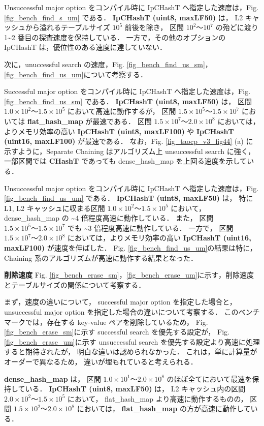 Unsuccessful major option をコンパイル時に IpCHashT へ指定した速度は，Fig. \ref{fig_bench_find_s_um} である．
{\bf IpCHashT (uint8, maxLF50)} は，
L2 キャッシュから溢れるテーブルサイズ $10^5$ 前後を除き，
区間 $10^2〜10^7$ の殆どに渡り 1\textasciitilde 2 番目の探査速度を保持している．
一方で，その他のオプションの IpCHashT は，優位性のある速度に達していない．

次に，unuccessful search の速度，Fig. \ref{fig_bench_find_us_sm}，\ref{fig_bench_find_us_um}について考察する．

Successful major option をコンパイル時に IpCHashT へ指定した速度は，Fig. \ref{fig_bench_find_us_sm} である．
{\bf IpCHashT (uint8, maxLF50)} は，
区間 $1.0\times10^2〜1.5\times10^5$ において高速に動作するが，
区間 $1.5\times10^5〜1.5\times10^7$ においては {\bf flat\_hash\_map} が最速である．
区間 $1.5\times10^7〜2.0\times10^8$ においては，よりメモリ効率の高い
{\bf IpCHashT (uint8, maxLF100)} や {\bf IpCHashT (uint16, maxLF100)} が最速である．
なお，Fig. \ref{fig_taocp_v3_fig44} (a) に示すように，Separate Chaining はアルゴリズム上 unsuccessful search に強く，
一部区間では {\bf CHashT} であっても dense\_hash\_map を上回る速度を示している．

Unsuccessful major option をコンパイル時に IpCHashT へ指定した速度は，Fig. \ref{fig_bench_find_us_um} である．
{\bf IpCHashT (uint8, maxLF50)} は，
特に L1, L2 キャッシュに収まる区間 $1.0\times10^2〜1.5\times10^5$ において，
dense\_hash\_map の \textasciitilde4 倍程度高速に動作している．
また，
区間 $1.5\times10^5〜1.5\times10^7$ でも \textasciitilde3 倍程度高速に動作している．
一方で，
区間 $1.5\times10^7〜2.0\times10^8$ においては，よりメモリ効率の高い {\bf IpCHashT (uint16, maxLF100)} が速度を伸ばした．
Fig. \ref{fig_bench_find_us_um}の結果は特に，Chaining 系のアルゴリズムが高速に動作する結果となった．
\leavevmode \newline

%
{\bf 削除速度}
\samepage\newline\indent
Fig. \ref{fig_bench_erase_sm}，\ref{fig_bench_erase_um}に示す，削除速度とテーブルサイズの関係について考察する．

まず，速度の違いについて，
successful major option を指定した場合と，
unsuccessful major option を指定した場合の違いについて考察する．
このベンチマークでは，存在する key-value ペアを削除しているため，
Fig. \ref{fig_bench_erase_sm}に示す successful search を優先する設定が，
Fig. \ref{fig_bench_erase_um}に示す unsuccessful search を優先する設定より高速に処理すると期待されたが，
明白な違いは認められなかった．
これは，単に計算量がオーダーで異なるため，
違いが埋もれていると考えられる．

{\bf dense\_hash\_map} は，
区間 $1.0\times10^1〜2.0\times10^8$ のほぼ全てにおいて最速を保持している．
{\bf IpCHashT (uint8, maxLF50)} は，
L2 キャッシュ内の区間 $2.0\times10^2〜1.5\times10^5$ において，
flat\_hash\_map より高速に動作するものの，
区間 $1.5\times10^2〜2.0\times10^8$ においては，
{\bf flat\_hash\_map} の方が高速に動作している．


